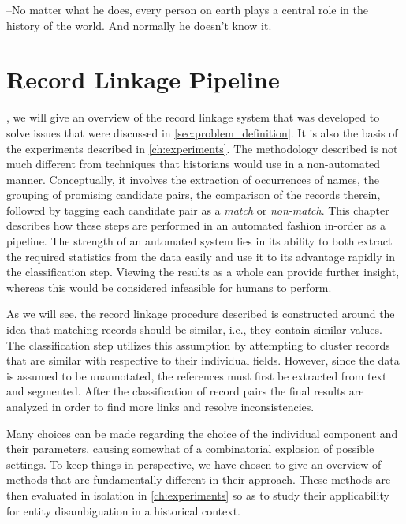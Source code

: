 \begin{savequote}[75mm] 
--No matter what he does, every person on earth plays a central role in the history of the world. And normally he doesn't know it.
\end{savequote}




\chapter{Record Linkage Pipeline}
\label{ch:record_linker}

, we will give an overview of the record linkage system that was developed to solve issues that were discussed in \cref{sec:problem_definition}.
It is also the basis of the experiments described in \cref{ch:experiments}.
The methodology described is not much different from techniques that historians would use in a non-automated manner.
Conceptually, it involves the extraction of occurrences of names, the grouping of promising candidate pairs, the comparison of the records therein, followed by tagging each candidate pair as a \emph{match} or \emph{non-match}.
This chapter describes how these steps are performed in an automated fashion in-order as a pipeline.
The strength of an automated system lies in its ability to both extract the required statistics from the data easily and use it to its advantage rapidly in the classification step.
Viewing the results as a whole can provide further insight, whereas this would be considered infeasible for humans to perform.

As we will see, the record linkage procedure described is constructed around the idea that matching records should be similar, i.e., they contain similar values.
The classification step utilizes this assumption by attempting to cluster records that are similar with respective to their individual fields. 
However, since the data is assumed to be unannotated, the references must first be extracted from text and segmented.
After the classification of record pairs the final results are analyzed in order to find more links and resolve inconsistencies.

Many choices can be made regarding the choice of the individual component and their parameters, causing somewhat of a combinatorial explosion of possible settings.
To keep things in perspective, we have chosen to give an overview of methods that are fundamentally different in their approach.
These methods are then evaluated in isolation in \cref{ch:experiments} so as to study their applicability for entity disambiguation in a historical context.



